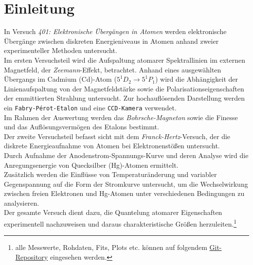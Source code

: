 \chapter{Einleitung}
In Versuch \textit{401: Elektronische Übergängen in Atomen} werden elektronische Übergänge zwischen diskreten Energieniveaus in Atomen anhand zweier experimenteller
Methoden untersucht.
\vspace{0.3cm}\\
Im ersten Versuchsteil wird die Aufspaltung atomarer Spektrallinien im externen Magnetfeld, der \textit{Zeemann}-Effekt, betrachtet. Anhand eines ausgewählten
Übergangs im Cadmium (Cd)-Atom ($5^1D_2 \rightarrow 5^1P_1$) wird die Abhängigkeit der Linienaufspaltung von der Magnetfeldstärke sowie die Polarisationseigenschaften der 
emmittierten Strahlung untersucht. Zur hochauflösenden Darstellung werden ein \texttt{Fabry-Pérot-Etalon} und eine \texttt{CCD-Kamera} verwendet.\\
Im Rahmen der Auswertung werden das \textit{Bohrsche-Magneton} sowie die Finesse und das Auflösungsvermögen des Etalons bestimmt.
\vspace{0.3cm}\\
Der zweite Versuchsteil befasst sicht mit dem  \textit{Franck-Hertz}-Versuch, der die diskrete Energieaufnahme von Atomen bei Elektronenstößen untersucht.\\
Durch Aufnahme der Anodenstrom-Spannungs-Kurve und deren Analyse wird die Anregungsenergie von Quecksilber (Hg)-Atomen ermittelt.\\
Zusätzlich werden die Einflüsse von Temperaturänderung und variabler Gegenspannung auf die Form der Stromkurve untersucht, um die Wechselwirkung zwischen freien Elektronen und Hg-Atomen
unter verschiedenen Bedingungen zu analysieren.
\vspace{0.3cm}\\
Der gesamte Versuch dient dazu, die Quantelung atomarer Eigenschaften experimentell nachzuweisen und daraus charakteristische Größen herzuleiten.\footnote{alle Messwerte, Rohdaten, Fits, Plots etc. können auf folgendem \href{https://github.com/itzhaQQ/P4.git}{Git-Repository} eingesehen werden.}